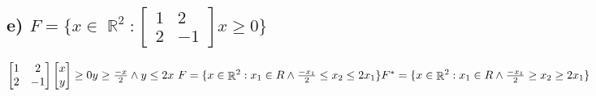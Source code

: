 \documentclass[12pt]{article}
\DeclareMathOperator{\R}{\mathbb{R}}
\begin{document}
\subsection*{e) \(F=\{x \in \R^2: \begin{bmatrix}1&2\\2&-1\end{bmatrix} x\geq 0 \}\)}
\begin{math}
    \begin{bmatrix}
    1&2\\2&-1
    \end{bmatrix} 
    \begin{bmatrix} 
    x \\ y 
    \end{bmatrix} \geq 0\\
    y\geq \frac{-x}{2} \land y \leq 2x\\$ $\\
    F=\{x \in \R^2: x_1 \in R \land  \frac{-x_1}{2} \leq x_2 \leq 2x_1  \}\\
    F^*=\{x \in \R^2: x_1 \in R \land  \frac{-x_1}{2} \geq x_2 \geq 2x_1  \}
\end{math}
\end{document}
